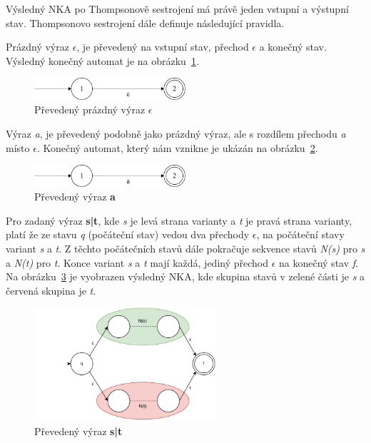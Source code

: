 Výsledný NKA po Thompsonově sestrojení má právě jeden vstupní a výstupní stav. 
Thompsonovo sestrojení dále definuje následující pravidla.

Prázdný výraz \textit{$\epsilon$}, je převedený na vstupní stav, přechod \textit{$\epsilon$} a konečný stav.
Výsledný konečný automat je na obrázku~\ref{fig:NFAepsilon}.
\begin{figure}[!h]
	\centering
	\includegraphics[width=0.5\textwidth]{Figures/NFA_epsilon.pdf}
	\caption{Převedený prázdný výraz \textbf{$\epsilon$}}
	\label{fig:NFAepsilon}
\end{figure}

Výraz \textit{a}, je převedený podobně jako prázdný výraz, ale s rozdílem přechodu \textit{a} místo \textit{$\epsilon$}.
Konečný automat, který nám vznikne je ukázán na obrázku~\ref{fig:NFAa}.
\begin{figure}[!h]
	\centering
	\includegraphics[width=0.5\textwidth]{Figures/NFA_a.pdf}
	\caption{Převedený výraz \textbf{a}}
	\label{fig:NFAa}
\end{figure}

Pro zadaný výraz \textbf{s|t}, kde \textit{s} je levá strana varianty a \textit{t} je pravá strana varianty, platí že ze stavu \textit{q} (počáteční stav) vedou dva přechody
\textit{$\epsilon$}, na počáteční stavy variant \textit{s} a \textit{t}. 
Z těchto počátečních stavů dále pokračuje sekvence stavů \textit{N(s)} pro \textit{s} a \textit{N(t)} pro \textit{t}.
Konce variant \textit{s} a \textit{t} mají každá, jediný přechod \textit{$\epsilon$} na konečný stav \textit{f}.
Na obrázku~\ref{fig:NFAunion} je vyobrazen výsledný NKA, kde skupina stavů v zelené části je \textit{s} a červená skupina je \textit{t}.
\begin{figure}[!h]
	\centering
	\includegraphics[width=0.6\textwidth]{Figures/NFA_union.pdf}
	\caption{Převedený výraz \textbf{s|t}}
	\label{fig:NFAunion}
\end{figure}

